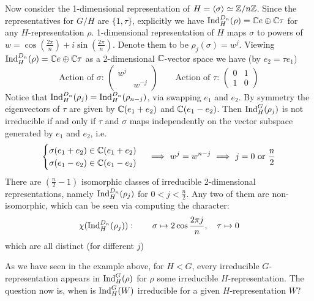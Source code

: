 \documentclass{article}
\begin{document}
\begin{example}[Representations of $D_n$]
    Now consider the 1-dimensional representation of $H = \left\langle \sigma \right\rangle \simeq \mathbb{Z}/n\mathbb{Z}$. Since the representatives for $G/H$ are $\{1, \tau\}$, explicitly we have $\mathrm{Ind}_H^{D_n} (\rho) = \mathbb{C} e \oplus \mathbb{C} \tau$ for any $H$-representation $\rho$. 1-dimensional representation of $H$ maps $\sigma$ to powers of $w = \cos(\frac{2\pi}{n}) + i \sin(\frac{2\pi}{n})$. Denote them to be $\rho_j (\sigma) = w^j$. Viewing $\mathrm{Ind}_H^{D_n} (\rho) = \mathbb{C} e \oplus \mathbb{C} \tau$ as a 2-dimensional $\mathbb{C}$-vector space we have (by $e_2 = \tau e_1$)
    \[
        \text{Action of $\sigma$: }
        \begin{pmatrix}
            w^j & \\
            & w^{-j}
        \end{pmatrix}
        \qquad
        \text{Action of $\tau$: }
        \begin{pmatrix}
            0 & 1 \\
            1 & 0
        \end{pmatrix}
    \]
    Notice that $\mathrm{Ind}_H^{D_n} (\rho_j) = \mathrm{Ind}_H^{D_n} (\rho_{n-j})$, via swapping $e_1$ and $e_2$. By symmetry the eigenvectors of $\tau$ are given by $\mathbb{C}(e_1 + e_2)$ and $\mathbb{C}(e_1 - e_2)$. Then $\mathrm{Ind}_H^G (\rho_j)$ is not irreducible if and only if $\tau$ and $\sigma$ maps independently on the vector subspace generated by $e_1$ and $e_2$, i.e. 
    \[
        \begin{cases}
            \sigma(e_1 + e_2) \in \mathbb{C}(e_1 + e_2) \\
            \sigma(e_1 - e_2) \in \mathbb{C}(e_1 - e_2) \\
        \end{cases}
        \ \Longrightarrow\  
        w^j = w^{n-j}
        \ \Longrightarrow\ 
        j = 0 \text{ or } \frac{n}{2}
    \]
     There are $\left( \frac{n}{2} - 1 \right)$ isomorphic classes of irreducible 2-dimensional representations, namely $\mathrm{Ind}_H^{D_n} (\rho_j)$ for $0 < j < \frac{n}{2}$. Any two of them are non-isomorphic, which can be seen via computing the character:
    \[
        \chi (\mathrm{Ind}_H^{D_n} (\rho_j)): \qquad \sigma \mapsto 2 \cos \frac{2\pi j}{n}, \quad \tau \mapsto 0
    \]
    which are all distinct (for different $j$)
\end{example}

As we have seen in the example above, for $H < G$, every irreducible $G$-representation appears in $\mathrm{Ind}_H^G(\rho)$ for $\rho$ some irreducible $H$-representation. The question now is, when is $\mathrm{Ind}_H^G(W)$ irreducible for a given $H$-representation $W$?
\end{document}
